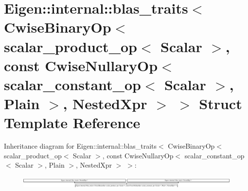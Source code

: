 \hypertarget{struct_eigen_1_1internal_1_1blas__traits_3_01_cwise_binary_op_3_01scalar__product__op_3_01_scala460c90a32ed86eb7afe907bd9f50947d}{}\section{Eigen\+:\+:internal\+:\+:blas\+\_\+traits$<$ Cwise\+Binary\+Op$<$ scalar\+\_\+product\+\_\+op$<$ Scalar $>$, const Cwise\+Nullary\+Op$<$ scalar\+\_\+constant\+\_\+op$<$ Scalar $>$, Plain $>$, Nested\+Xpr $>$ $>$ Struct Template Reference}
\label{struct_eigen_1_1internal_1_1blas__traits_3_01_cwise_binary_op_3_01scalar__product__op_3_01_scala460c90a32ed86eb7afe907bd9f50947d}
Inheritance diagram for Eigen\+:\+:internal\+:\+:blas\+\_\+traits$<$ Cwise\+Binary\+Op$<$ scalar\+\_\+product\+\_\+op$<$ Scalar $>$, const Cwise\+Nullary\+Op$<$ scalar\+\_\+constant\+\_\+op$<$ Scalar $>$, Plain $>$, Nested\+Xpr $>$ $>$\+:\begin{figure}[H]
\begin{center}
\leavevmode
\includegraphics[height=0.620155cm]{struct_eigen_1_1internal_1_1blas__traits_3_01_cwise_binary_op_3_01scalar__product__op_3_01_scala460c90a32ed86eb7afe907bd9f50947d}
\end{center}
\end{figure}

